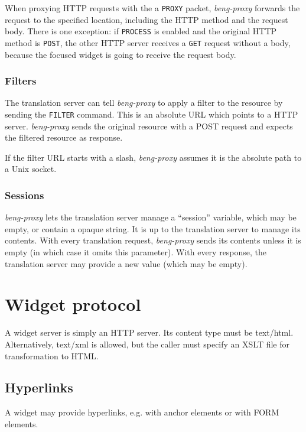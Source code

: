 \documentclass[a4paper,12pt]{article}
\begin{document}
When proxying HTTP requests with the a \texttt{PROXY} packet,
\emph{beng-proxy} forwards the request to the specified location,
including the HTTP method and the request body.  There is one
exception: if \texttt{PROCESS} is enabled and the original HTTP method
is \texttt{POST}, the other HTTP server receives a \texttt{GET}
request without a body, because the focused widget is going to receive
the request body.

\subsubsection{Filters}
\label{filter}

The translation server can tell \emph{beng-proxy} to apply a filter to
the resource by sending the \texttt{FILTER} command.  This is an
absolute URL which points to a HTTP server.  \emph{beng-proxy} sends
the original resource with a POST request and expects the filtered
resource as response.

If the filter URL starts with a slash, \emph{beng-proxy} assumes it is
the absolute path to a Unix socket.

\subsubsection{Sessions}
\label{sessions}

\emph{beng-proxy} lets the translation server manage a ``session''
variable, which may be empty, or contain a opaque string.  It is up to
the translation server to manage its contents.  With every translation
request, \emph{beng-proxy} sends its contents unless it is empty (in
which case it omits this parameter).  With every response, the
translation server may provide a new value (which may be empty).


\section{Widget protocol}

A widget server is simply an HTTP server.  Its content type must be
text/html.  Alternatively, text/xml is allowed, but the caller must
specify an XSLT file for transformation to HTML.


\subsection{Hyperlinks}

A widget may provide hyperlinks, e.g. with anchor elements or with
FORM elements.
\end{document}
